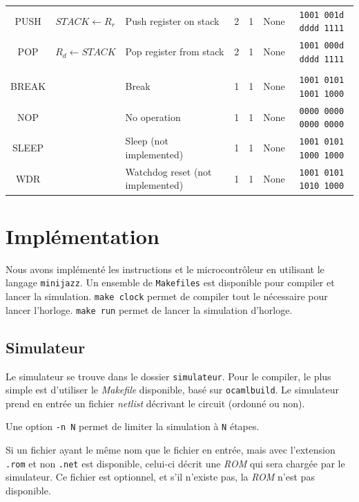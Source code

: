 \documentclass[11pt]{article}
\begin{document}
\begin{center}
\begin{longtable}{|c|m{10em}|l|c|c|c|c|}
PUSH & $STACK \leftarrow R_r$ & Push register on stack & 2 & 1 & None & \texttt{1001 001d dddd 1111}\\
POP & $R_d \leftarrow STACK$ & Pop register from stack & 2 & 1 & None & \texttt{1001 000d dddd 1111}\\
\hline\hline
 \rowcolor{gray!10}
\multicolumn{7}{|c|}{Autre} \\
\hline
BREAK &  &  Break & 1 & 1 & None & \texttt{1001 0101 1001 1000}\\
NOP &  &  No operation & 1 & 1 & None & \texttt{0000 0000 0000 0000}\\
SLEEP &  & Sleep (not implemented) & 1 & 1 & None & \texttt{1001 0101 1000 1000}\\
WDR &  & Watchdog reset (not implemented) & 1 & 1 & None & \texttt{1001 0101 1010 1000}\\
\hline
\end{longtable}
\end{center}

\pagebreak
\normalsize
\section{Implémentation}

Nous avons implémenté les instructions et le microcontrôleur en utilisant le langage \texttt{minijazz}. Un ensemble de \texttt{Makefiles} est disponible pour compiler et lancer la simulation. \texttt{make clock} permet de compiler tout le nécessaire pour lancer l'horloge. \texttt{make run} permet de lancer la simulation d'horloge.

\subsection{Simulateur}

Le simulateur se trouve dans le dossier \texttt{simulateur}. Pour le compiler, le plus simple est d'utiliser le \emph{Makefile} disponible, basé sur \texttt{ocamlbuild}. Le simulateur prend en entrée un fichier \emph{netlist} décrivant le circuit (ordonné ou non).

Une option \texttt{-n N} permet de limiter la simulation à \texttt{N} étapes.

Si un fichier ayant le même nom que le fichier en entrée, mais avec l'extension \texttt{.rom} et non \texttt{.net} est disponible, celui-ci décrit une \emph{ROM} qui sera chargée par le simulateur. Ce fichier est optionnel, et s'il n'existe pas, la \emph{ROM} n'est pas disponible.
\end{document}
